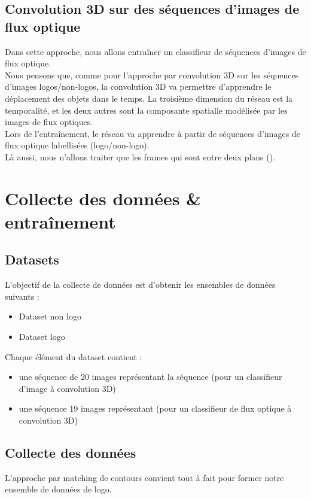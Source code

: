 \documentclass[11pt]{article}
\begin{document}
\subsection{Convolution 3D sur des séquences d'images de flux optique}
\label{sec:org3ef6a9f}
Dans cette approche, nous allons entraîner un classifieur de séquences d'images de flux optique.\\
Nous pensons que, comme pour l'approche par convolution 3D sur les séquences d'images logos/non-logos, la convolution 3D va permettre d'apprendre le déplacement des objets dans le temps. La troisième dimension du réseau est la temporalité, et les deux autres sont la composante spatialle modélisée par les images de flux optiques.\\
Lors de l'entraînement, le réseau va apprendre à partir de séquences d'images de flux optique labellisées (logo/non-logo).\\
Là aussi, nous n'allons traiter que les frames qui sont entre deux plans (\cite{Abd_Almageed_2008}).\\

\section{Collecte des données \& entraînement}
\label{sec:orgde72ad0}
\subsection{Datasets}
\label{sec:orgd0851a0}
L'objectif de la collecte de données est d'obtenir les ensembles de données suivants :\\
\begin{itemize}
\item Dataset non logo\\
\item Dataset logo\\
\end{itemize}
Chaque élément du dataset contient :\\
\begin{itemize}
\item une séquence de 20 images représentant la séquence (pour un classifieur d'image à convolution 3D)\\
\item une séquence 19 images représentant (pour un classifieur de flux optique à convolution 3D)\\
\end{itemize}

\subsection{Collecte des données}
\label{sec:orge28b7b6}
L'approche par matching de contours convient tout à fait pour former notre ensemble de données de logo.\\
\end{document}
